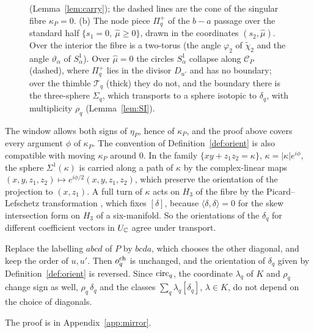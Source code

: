 \begin{figure}[ht]
{(Lemma~\ref{lem:carry}); the dashed lines are the cone of the singular fibre $\kappa_P=0$. (b) The node piece
$\Pi_q^+$ of the $b-a$ passage over the standard half $\{s_1=0,\ \hat\mu\ge0\}$, drawn in the coordinates
$(s_2,\hat\mu)$. Over the interior the fibre is a two-torus (the angle $\varphi_2$ of $\tilde\chi_2$ and the angle
$\vartheta_\alpha$ of $S^1_\alpha$). Over $\hat\mu=0$ the circles $S^1_\alpha$ collapse along $\mathscr C_P$ (dashed), where
$\Pi_q^+$ lies in the divisor $D_{u'}$ and has no boundary; over the thimble $\mathscr T_q$ (thick) they do not, and the
boundary there is the three-sphere $\Sigma_q$, which transports to a sphere isotopic to $\delta_q$, with multiplicity $\rho_q$
(Lemma~\ref{lem:SI}).}\label{fig:morse}
\end{figure}

\begin{remark}\label{rem:kappa}
The window allows both signs of $\eta_P$, hence of $\kappa_P$, and the proof above covers every argument $\phi$ of
$\kappa_P$. The convention of Definition~\ref{def:orient} is also compatible with moving $\kappa_P$ around $0$. In the
family $\{xy+z_1z_2=\kappa\}$, $\kappa=|\kappa|e^{i\phi}$, the sphere $\Sigma^1(\kappa)$ is carried along a path of $\kappa$ by
the complex-linear maps $(x,y,z_1,z_2)\mapsto e^{i\phi/2}(x,y,z_1,z_2)$, which preserve the orientation of the projection
to $(x,z_1)$. A full turn of $\kappa$ acts on $H_3$ of the fibre by the Picard--Lefschetz transformation \cite{Lam81},
which fixes $[\delta]$, because $\langle\delta,\delta\rangle=0$ for the skew intersection form on $H_3$ of a
six-manifold. So the orientations of the $\delta_q$ for different coefficient vectors in $U_\mathbb C$ agree under transport.
\end{remark}

\begin{lemma}\label{lem:diag}
Replace the labelling $abcd$ of $P$ by $bcda$, which chooses the other diagonal, and keep the order of $u,u'$. Then
$o^{\rm ch}_q$ is unchanged, and the orientation of $\delta_q$ given by Definition~\ref{def:orient} is reversed. Since
$\mathrm{circ}_q$, the coordinate $\lambda_q$ of $K$ and $\rho_q$ change sign as well, $\rho_q\,\delta_q$ and the classes
$\sum_q\lambda_q[\delta_q]$, $\lambda\in K$, do not depend on the choice of diagonals.
\end{lemma}

The proof is in Appendix~\ref{app:mirror}.
